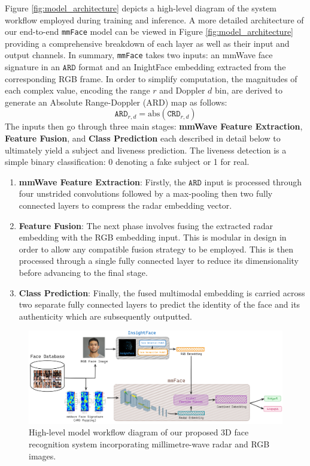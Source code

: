 \documentclass{mpaper}
\begin{document}
Figure \ref{fig:model_architecture} depicts a high-level diagram of the system workflow employed during training and inference. A more detailed architecture of our end-to-end \texttt{mmFace} model can be viewed in Figure \ref{fig:model_architecture} providing a comprehensive breakdown of each layer as well as their input and output channels. In summary, \texttt{mmFace} takes two inputs: an mmWave face signature in an $\mathtt{ARD}$ format and an InightFace embedding extracted from the corresponding RGB frame. In order to simplify computation, the magnitudes of each complex value, encoding the range $r$ and Doppler $d$ bin, are derived to generate an Absolute Range-Doppler (ARD) map as follows:
$$\mathtt{ARD}_{r,d} = \text{abs}(\mathtt{CRD}_{r,d})$$
The inputs then go through three main stages: \textbf{mmWave Feature Extraction}, \textbf{Feature Fusion}, and \textbf{Class Prediction} each described in detail below to ultimately yield a subject and liveness prediction. The liveness detection is a simple binary classification: 0 denoting a fake subject or 1 for real.
\vspace{-0.1cm}
\begin{enumerate}
    \itemsep0.01cm
    \item \textbf{mmWave Feature Extraction}: Firstly, the $\mathtt{ARD}$ input is processed through four unstrided convolutions followed by a max-pooling then two fully connected layers to compress the radar embedding vector. 
    \item \textbf{Feature Fusion}: The next phase involves fusing the extracted radar embedding with the RGB embedding input. This is modular in design in order to allow any compatible fusion strategy to be employed. This is then processed through a single fully connected layer to reduce its dimensionality before advancing to the final stage. 
    \item \textbf{Class Prediction}: Finally, the fused multimodal embedding is carried across two separate fully connected layers to predict the identity of the face and its authenticity which are subsequently outputted.
\end{enumerate}

\begin{figure}[h!]
    \centering
    \includegraphics[width=1\textwidth]{figures/model_workflow.png}
    \vspace{0.001cm}
    \caption{High-level model workflow diagram of our proposed 3D face recognition system incorporating millimetre-wave radar and RGB images.}
    \label{fig:model_workflow}
\end{figure}
\end{document}
